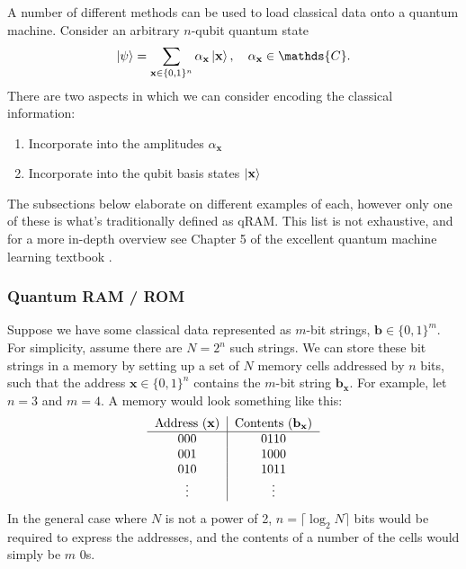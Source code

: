 \documentclass[a4paper,12pt]{article}
\begin{document}
A number of different methods can be used to load classical data onto a quantum machine.
Consider an arbitrary $n$-qubit quantum state
\begin{equation}
 \ket{\psi} = \sum_{\mathbf{x} \in \{0, 1\}^n} \alpha_{\mathbf{x}} \ket{\mathbf{x}}, \quad \alpha_{\mathbf{x}} \in \mathds{C}.
\end{equation}
There are two aspects in which we can consider encoding the classical information:
\begin{enumerate}
 \item Incorporate into the amplitudes $\alpha_{\mathbf{x}}$
 \item Incorporate into the qubit basis states $\ket{\mathbf{x}}$
\end{enumerate}
The subsections below elaborate on different examples of each, however only one of these is what's traditionally defined as qRAM.
This list is not exhaustive, and for a more in-depth overview see Chapter 5 of the excellent quantum machine learning textbook \cite{Schuld2018}.

\subsubsection{Quantum RAM / ROM}
Suppose we have some classical data represented as $m$-bit strings, $\mathbf{b} \in \{0, 1\}^m$. 
For simplicity, assume there are $N = 2^n$ such strings.
We can store these bit strings in a memory by setting up a set of $N$ memory cells addressed by $n$ bits, such that the address $\mathbf{x} \in \{0, 1\}^n$ contains the $m$-bit string $\mathbf{b}_{\mathbf{x}}$.
For example, let $n = 3$ and $m = 4$.
A memory would look something like this:
\begin{equation}
 \begin{tabular}{c|c}
  \hbox{Address (}$\mathbf{x}$) & \hbox{Contents (}$\mathbf{b}_{\mathbf{x}})$ \\ \hline
  000 & 0110 \\
  001 & 1000 \\
  010 & 1011 \\ 
  $\vdots$ & $\vdots$
  \end{tabular}
  \label{eq:qram_table}
\end{equation}
In the general case where $N$ is not a power of 2, $n = \lceil \log_2 N \rceil$ bits would be required to express the addresses, and the contents of a number of the cells would simply be $m$ 0s.
\end{document}
